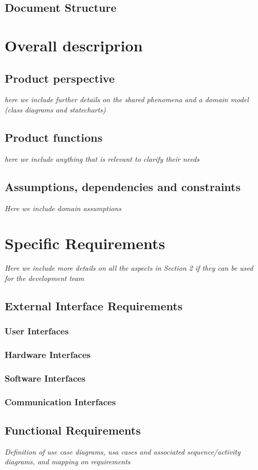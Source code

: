 \documentclass{article}
\begin{document}
	\subsection{Document Structure}
\section{Overall descriprion}
	\subsection{Product perspective} \textit{here we include further details on the shared phenomena and a domain model (class diagrams and statecharts)}
	\subsection{Product functions}\textit{here we include anything that is relevant to clarify their needs}
	\subsection{Assumptions, dependencies and constraints} \textit{Here we include domain assumptions}
\section{Specific Requirements} \textit{Here we include more details on all the aspects in Section 2 if they can be used for the development team}
	\subsection{External Interface Requirements}
		\subsubsection{User Interfaces}
		\subsubsection{Hardware Interfaces}
		\subsubsection{Software Interfaces}
		\subsubsection{Communication Interfaces}
	\subsection{Functional Requirements} \textit{Definition of use case diagrams, usa cases and associated sequence/activity diagrams, and mapping on requirements}
\end{document}
